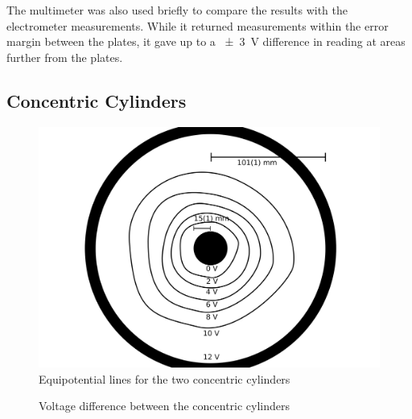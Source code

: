 \documentclass[a4paper]{scrartcl}
\begin{document}
The multimeter was also used briefly to compare the results with the electrometer measurements. While it returned measurements within the error margin between the plates, it gave up to a \SI{\pm 3}{\volt} difference in reading at areas further from the plates.

\subsection{Concentric Cylinders}
\begin{figure}
    \centering
    \includegraphics[width = 15cm]{lab2_concentric_cylinders.png}
    \caption{Equipotential lines for the two concentric cylinders}
    \label{fig:concentric_cylinders}
\end{figure}
\begin{figure}
    \centering
    \caption{Voltage difference between the concentric cylinders}
    \label{fig:concentric_cylinders_voltage}
\end{figure}
\end{document}
